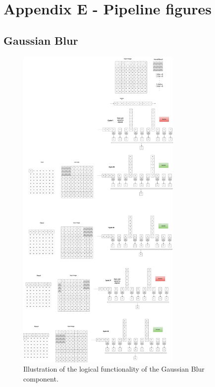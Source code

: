 \section{Appendix E - Pipeline figures}




\subsection{Gaussian Blur}

\begin{figure}[!hbpt]
    \centering
    \includegraphics[width=8cm]{Images/gauss.png}
    \caption{Illustration of the logical functionality of the  Gaussian Blur component.}
    \label{fig:gauss}
\end{figure}
